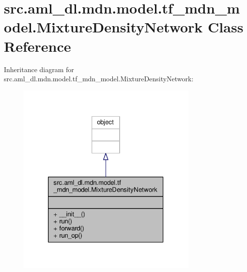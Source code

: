 \hypertarget{classsrc_1_1aml__dl_1_1mdn_1_1model_1_1tf__mdn__model_1_1_mixture_density_network}{\section{src.\-aml\-\_\-dl.\-mdn.\-model.\-tf\-\_\-mdn\-\_\-model.\-Mixture\-Density\-Network Class Reference}
\label{classsrc_1_1aml__dl_1_1mdn_1_1model_1_1tf__mdn__model_1_1_mixture_density_network}
}


Inheritance diagram for src.\-aml\-\_\-dl.\-mdn.\-model.\-tf\-\_\-mdn\-\_\-model.\-Mixture\-Density\-Network\-:
\nopagebreak
\begin{figure}[H]
\begin{center}
\leavevmode
\includegraphics[width=256pt]{classsrc_1_1aml__dl_1_1mdn_1_1model_1_1tf__mdn__model_1_1_mixture_density_network__inherit__graph}
\end{center}
\end{figure}


